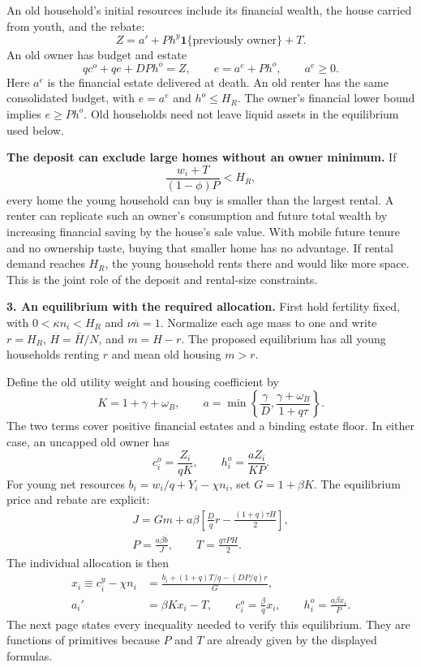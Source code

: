 \documentclass[11pt]{article}
\newcommand{\avg}[1]{\overline{#1}}
\begin{document}
An old household's initial resources include its financial wealth, the house
carried from youth, and the rebate:
\[
Z=a'+P h^y\mathbf 1\{\text{previously owner}\}+T.
\]
An old owner has budget and estate
\[
qc^o+qe+DP h^o=Z,\qquad
e=a^e+Ph^o,\qquad a^e\ge0.
\]
Here $a^e$ is the financial estate delivered at death. An old renter has the
same consolidated budget, with $e=a^e$ and $h^o\le H_R$.
The owner's financial lower bound implies $e\ge Ph^o$. Old households need
not leave liquid assets in the equilibrium used below.

\textbf{The deposit can exclude large homes without an owner minimum.}
If
\[
\frac{w_i+T}{(1-\phi)P}<H_R,
\]
every home the young household can buy is smaller than the largest rental.
A renter can replicate such an owner's consumption and future total wealth
by increasing financial saving by the house's sale value. With mobile future
tenure and no ownership taste, buying that smaller home has no advantage. If
rental demand
reaches $H_R$, the young household rents there and would like more space.
This is the joint role of the deposit and rental-size constraints.

\newpage
\textbf{3. An equilibrium with the required allocation.}
First hold fertility fixed, with $0<\kappa n_i<H_R$ and
$\nu\avg n=1$. Normalize each age mass to one and write
$r=H_R$, $H=\bar H/N$, and $m=H-r$. The proposed equilibrium has all young
households renting $r$ and mean old housing $m>r$.

Define the old utility weight and housing coefficient by
\[
K=1+\gamma+\omega_B,\qquad
a=\min\left\{\frac{\gamma}{D},
                  \frac{\gamma+\omega_B}{1+q\tau}\right\}.
\]
The two terms cover positive financial estates and a binding estate floor.
In either case, an uncapped old owner has
\[
c_i^o=\frac{Z_i}{qK},\qquad h_i^o=\frac{a Z_i}{KP}.
\]
For young net resources $b_i=w_i/q+Y_i-\chi n_i$, set $G=1+\beta K$.
The equilibrium price and rebate are explicit:
\[
\boxed{\begin{gathered}
J=Gm+a\beta\left[\frac Dq r-\frac{(1+q)\tau H}{2}\right],\\
P=\frac{a\beta\avg b}{J},\qquad T=\frac{q\tau PH}{2}.
\end{gathered}}
\]
The individual allocation is then
\[
\boxed{\begin{aligned}
x_i\equiv c_i^y-\chi n_i
 &=\frac{b_i+(1+q)T/q-(DP/q)r}{G},\\
a_i'&=\beta Kx_i-T,\qquad
c_i^o=\frac\beta qx_i,\qquad
h_i^o=\frac{a\beta x_i}{P}.
\end{aligned}}
\]
The next page states every inequality needed to verify this equilibrium.
They are functions of primitives because $P$ and $T$ are already given
by the displayed formulas.
\end{document}
